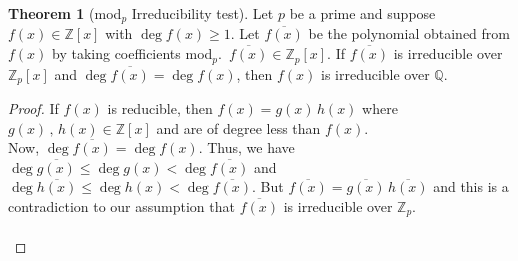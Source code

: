 \documentclass[11pt,a4paper]{article}
\theoremstyle{definition}
\newtheorem{thm}{Theorem}[subsection]
\begin{document}
\begin{thm}[mod$_p$ Irreducibility test]
Let $p$ be a prime and suppose $f(x)\in \mathbb{Z}[x]$ with $\deg f(x) \geq 1$. Let $\overline{f(x)}$ be the polynomial obtained from $f(x)$ by taking coefficients mod$_p$. $\, \overline{f(x)}\in \mathbb{Z}_p[x]$. If $\overline{f(x)}$ is irreducible over $\mathbb{Z}_p[x]$ and $\deg \overline{f(x)} = \deg f(x)$, then $f(x)$ is irreducible over $\mathbb{Q}$.\\
\end{thm}


\begin{proof}
If $f(x)$ is reducible, then $f(x) = g(x)\, h(x)$ where $g(x)\, , \, h(x)\in \mathbb{Z}[x]$ and are of degree less than $f(x)$.\\
Now, $\deg \overline{f(x)} = \deg f(x)$. Thus, we have $\deg \overline{g(x)} \leq \deg g(x) < \deg \overline{f(x)}$ and $\deg \overline{h(x)} \leq \deg h(x) < \deg \overline{f(x)}$. But $\overline{f(x)} = \overline{g(x)}\, \overline{h(x)}$ and this is a contradiction to our assumption that $\overline{f(x)}$ is irreducible over $\mathbb{Z}_p$.\\\\
\end{proof}
\end{document}
